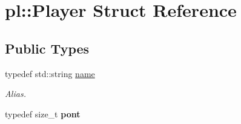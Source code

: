 \hypertarget{structpl_1_1Player}{}\section{pl\+:\+:Player Struct Reference}
\label{structpl_1_1Player}
\subsection*{Public Types}
\begin{DoxyCompactItemize}
\item 
\mbox{\label{structpl_1_1Player_a77a12ed18c2601e66b9357ce1a2c1d2b}} 
typedef std\+::string \hyperlink{structpl_1_1Player_a77a12ed18c2601e66b9357ce1a2c1d2b}{name}
\begin{DoxyCompactList}\small\item\em Alias. \end{DoxyCompactList}\item 
\mbox{\label{structpl_1_1Player_a58df8057021ecc82b4ee63ed63301e00}} 
typedef size\+\_\+t {\bfseries pont}
\end{DoxyCompactItemize}
